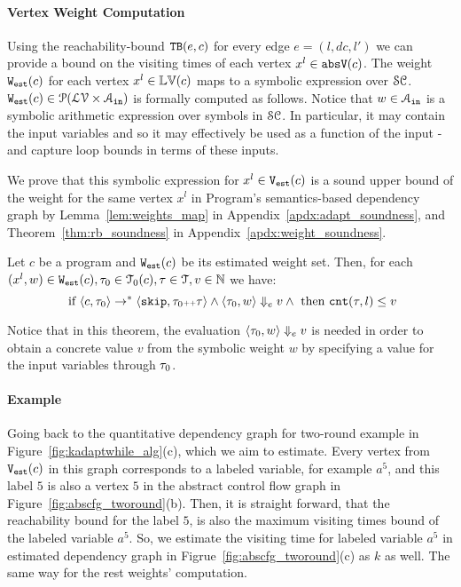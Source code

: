 \paragraph{Vertex Weight Computation}
Using the reachability-bound ${\mathtt{TB}}(e, c)$ for every edge $e = (l, dc, l')$ we can provide a bound on the visiting times of each vertex $x^l \in \mathtt{abs}{\mathtt{V}}(c)$.
The weight $\mathtt{{W_{est}}}(c)$
for each vertex $x^l \in \mathbb{LV}(c)$ maps to a symbolic expression over $\mathcal{SC}$.
$\mathtt{{W_{est}}}(c) \in \mathcal{P}(\mathcal{LV} \times \mathcal{A}_{\mathtt{in}})$ is formally computed
as follows.
%
Notice that $w \in \mathcal{A}_{\mathtt{in}}$ is a symbolic arithmetic expression over symbols in $\mathcal{SC}$. In particular, it may contain the input variables and so it may effectively be used as a function of the input - and capture loop bounds in terms of these inputs.
 
We prove that this 
symbolic expression for $x^l \in \mathtt{{V_{est}}}(c)$ is a sound upper bound of 
the weight for the same vertex $x^l$ in Program's semantics-based dependency graph by Lemma~\ref{lem:weights_map}
in Appendix~\ref{apdx:adapt_soundness}, and Theorem~\ref{thm:rb_soundness} in Appendix~\ref{apdx:weight_soundness}.

\begin{thm}
  \label{thm:addweight_soundness}
Let  ${c}$ be a program and $\mathtt{{W_{est}}}(c)$ be its estimated weight set.
Then, for each $(x^l, w) \in \mathtt{{W_{est}}}(c),\mathtt{\tau}_0 \in \mathcal{T}_0(c), \mathtt{\tau} \in \mathcal{T},
v \in \mathbb{N}$ we have:
\[
 \text{ if }
\langle {c}, \mathtt{\tau}_0 \rangle \to^{*} \langle \mathtt{skip}, \mathtt{\tau}_0 {\scriptscriptstyle ++}\mathtt{\tau} \rangle 
\land 
\langle \mathtt{\tau}_0, w \rangle \Downarrow_e v
\land
\text{ then }
\mathtt{cnt}(\mathtt{\tau}, l) \leq v
\]
\end{thm}
Notice that in this theorem, the evaluation $\langle \mathtt{\tau}_0, w \rangle \Downarrow_e v$ is needed in order to obtain a concrete value $v$ from the symbolic weight $w$ by specifying a value for the input variables through $\mathtt{\tau}_0$.


\paragraph*{Example}
Going back to the
quantitative dependency graph for two-round example in
Figure~\ref{fig:kadaptwhile_alg}(c), which we aim to estimate.
%
Every vertex from $\mathtt{{V_{est}}}(c)$ in this graph corresponds to a labeled variable, for example $a^5$,
and this label $5$ is also a vertex $5$ in the abstract control flow graph in Figure~\ref{fig:abscfg_tworound}(b).
%
Then, it is straight forward, 
that the reachability bound for the label $5$, 
is also the maximum visiting times bound of the labeled variable $a^5$.
So, we estimate the visiting time for  labeled variable $a^5$ in estimated dependency graph in Figrue~\ref{fig:abscfg_tworound}(c) as $k$ as well.
%
The same way for the rest weights' computation.